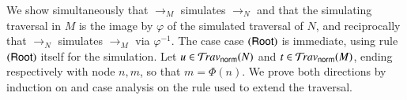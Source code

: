 \documentclass{elsarticle}
\newif\iflongversion
\theoremstyle{plain}
\theoremstyle{definition}
\newcommand{\normalizing}{{\sf norm}}
\newcommand{\travsetnorm}{\travset_\normalizing} %
\begin{document}

We show simultaneously that $\rightarrow_M$ simulates
$\rightarrow_N$ and that the simulating traversal in $M$ is the image
by $\varphi$ of the simulated traversal of $N$, and reciprocally that
$\rightarrow_N$ simulates $\rightarrow_M$ via $\varphi^{-1}$.
%
The case case $\mathbf{({\sf Root})}$ is immediate, using rule $\mathbf{({\sf Root})}$ itself for the simulation.
%
Let $u\in \travsetnorm(N)$ and $t\in\travsetnorm(M)$,
ending respectively with node $n, m$, so that $m = \Phi(n)$.
We prove both directions by induction on
and case analysis on the rule used to
extend the traversal.
%
\iflongversion

Observe that the result holds trivially up until the traversal in $M$ reaches occurrence $x$ since the exact same rules traversing $M$
can also traverse the corresponding nodes in $N$, and reciprocally for traversals of $N$ until reaching node $@_x$. The crucial part of the induction takes place when traversing the \emph{lloc} variable $x$ in $M$ (resp.~$@_x$ in $N$).
\fi
\end{document}

